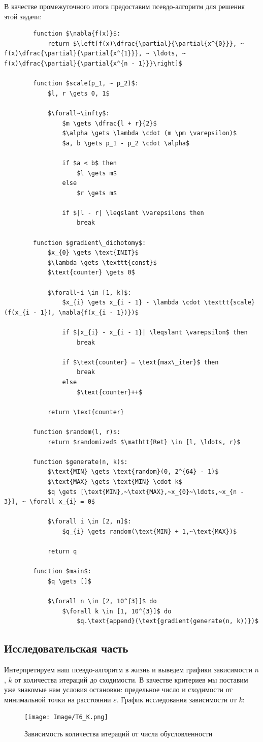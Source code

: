 \documentclass[12pt, a4paper, oneside, final]{article}
\begin{document}
	В качестве промежуточного итога предоставим псевдо-алгоритм для решения этой задачи:
	\begin{lstlisting}
		function $\nabla{f(x)}$:
			return $\left[f(x)\dfrac{\partial}{\partial{x^{0}}}, ~ f(x)\dfrac{\partial}{\partial{x^{1}}}, ~ \ldots, ~ f(x)\dfrac{\partial}{\partial{x^{n - 1}}}\right]$
		
		function $scale(p_1, ~ p_2)$:
			$l, r \gets 0, 1$

			$\forall~\infty$:
				$m \gets \dfrac{l + r}{2}$
				$\alpha \gets \lambda \cdot (m \pm \varepsilon)$
				$a, b \gets p_1 - p_2 \cdot \alpha$
		
				if $a < b$ then
					$l \gets m$
				else
					$r \gets m$
		
				if $|l - r| \leqslant \varepsilon$ then
					break
		
		function $gradient\_dichotomy$:
			$x_{0} \gets \text{INIT}$
			$\lambda \gets \texttt{const}$
			$\text{counter} \gets 0$

			$\forall~i \in [1, k]$:
				$x_{i} \gets x_{i - 1} - \lambda \cdot \texttt{scale}(f(x_{i - 1}), \nabla{f(x_{i - 1})})$

				if $|x_{i} - x_{i - 1}| \leqslant \varepsilon$ then
					break

				if $\text{counter} = \text{max\_iter}$ then
					break
				else
					$\text{counter}++$
		
			return \text{counter}
		
		function $random(l, r)$:
			return $randomized$ $\mathtt{Ret} \in [l, \ldots, r)$
		
		function $generate(n, k)$:
			$\text{MIN} \gets \text{random}(0, 2^{64} - 1)$
			$\text{MAX} \gets \text{MIN} \cdot k$
			$q \gets [\text{MIN},~\text{MAX},~x_{0}~\ldots,~x_{n - 3}], ~ \forall x_{i} = 0$
		
			$\forall i \in [2, n]$:
				$q_{i} \gets random(\text{MIN} + 1,~\text{MAX})$
		
			return q
		
		function $main$:
			$q \gets []$

			$\forall n \in [2, 10^{3}]$ do
				$\forall k \in [1, 10^{3}]$ do
					$q.\text{append}(\text{gradient(generate(n, k))})$
	\end{lstlisting}
	\subsection*{Исследовательская часть}
	Интерпретируем наш псевдо-алгоритм в жизнь и выведем графики зависимости $n$, $k$ от количества итераций до сходимости. В качестве критериев мы поставим уже знакомые нам условия остановки: предельное число и сходимости от минимальной точки на расстоянии $\varepsilon$. График исследования зависимости от $k$:
	 \begin{figure}[H]
	 	\centering
	 	\texttt{[image: Image/T6\_K.png]}
	 	\caption{Зависимость количества итераций от числа обусловленности}
	 \end{figure}
	\newpage
\end{document}
